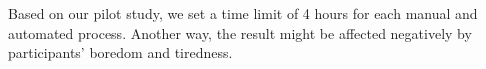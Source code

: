 Based on our pilot study, we set a time limit of 4 hours for each manual and automated process. Another way, the result might be affected negatively by participants' boredom and tiredness. 







